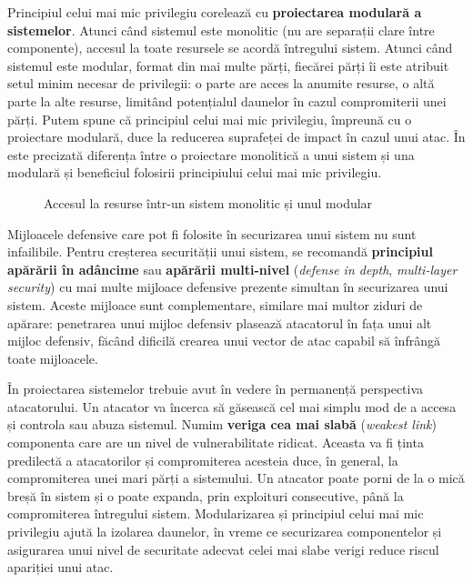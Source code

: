 Principiul celui mai mic privilegiu corelează cu \textbf{proiectarea modulară a sistemelor}. Atunci când sistemul este monolitic (nu are separații clare între componente), accesul la toate resursele se acordă întregului sistem. Atunci când sistemul este modular, format din mai multe părți, fiecărei părți îi este atribuit setul minim necesar de privilegii: o parte are acces la anumite resurse, o altă parte la alte resurse, limitând potențialul daunelor în cazul compromiterii unei părți. Putem spune că principiul celui mai mic privilegiu, împreună cu o proiectare modulară, duce la reducerea suprafeței de impact în cazul unui atac. În  este precizată diferența între o proiectare monolitică a unui sistem și una modulară și beneficiul folosirii principiului celui mai mic privilegiu.

\begin{figure}[htbp]
  \centering
  \def\svgwidth{\columnwidth}
  
  \caption{Accesul la resurse într-un sistem monolitic și unul modular}
  \label{fig:sec:modular-vs-monolithic}
\end{figure}

Mijloacele defensive care pot fi folosite în securizarea unui sistem nu sunt infailibile. Pentru creșterea securității unui sistem, se recomandă \textbf{principiul apărării în adâncime} sau \textbf{apărării multi-nivel} (\textit{defense in depth}, \textit{multi-layer security}) cu mai multe mijloace defensive prezente simultan în securizarea unui sistem. Aceste mijloace sunt complementare, similare mai multor ziduri de apărare: penetrarea unui mijloc defensiv plasează atacatorul în fața unui alt mijloc defensiv, făcând dificilă crearea unui vector de atac capabil să înfrângă toate mijloacele.

În proiectarea sistemelor trebuie avut în vedere în permanență perspectiva atacatorului. Un atacator va încerca să găsească cel mai simplu mod de a accesa și controla sau abuza sistemul. Numim \textbf{veriga cea mai slabă} (\textit{weakest link}) componenta care are un nivel de vulnerabilitate ridicat. Aceasta va fi ținta predilectă a atacatorilor și compromiterea acesteia duce, în general, la compromiterea unei mari părți a sistemului. Un atacator poate porni de la o mică breșă în sistem și o poate expanda, prin exploituri consecutive, până la compromiterea întregului sistem. Modularizarea și principiul celui mai mic privilegiu ajută la izolarea daunelor, în vreme ce securizarea componentelor și asigurarea unui nivel de securitate adecvat celei mai slabe verigi reduce riscul apariției unui atac.

